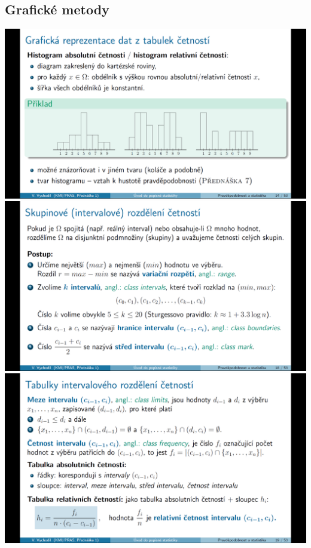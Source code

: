 \documentclass[12pt,a4paper]{article}
\begin{document}
\subsection{Grafické metody}
\begin{center}
	\includegraphics[scale=0.32]{img/graficke_metody_histogram}
	\includegraphics[scale=0.32]{img/graficke_metody_intervalove_rozdeleni}
	\includegraphics[scale=0.32]{img/graficke_metody_intervalove_rozdeleni_tabulky}

\end{center}
\end{document}

